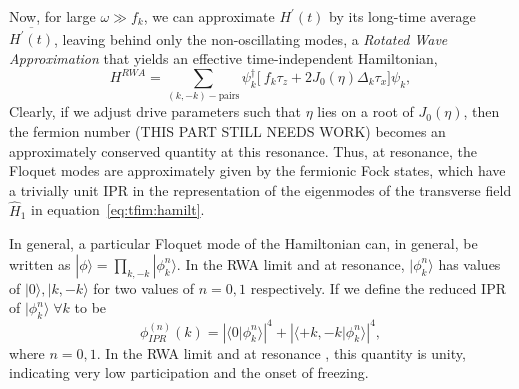 \documentclass[%
 reprint,
superscriptaddress,
 amsmath,amssymb,
 aps,
prb,
]{revtex4-2}
\begin{document}
Now, for large $\omega \gg f_k$, we can approximate $H^\prime(t)$ by its long-time average $\overline{H^\prime(t)}$, leaving behind only the non-oscillating modes, a  \textit{Rotated Wave Approximation} that yields an effective time-independent Hamiltonian,
\begin{equation}
H^{RWA} = \sum_{(k,-k)-\mbox{pairs}} \psi^\dagger_k
\bigg[\ f_k\tau_z + 2 J_0(\eta) \Delta_k\tau_x \bigg]\psi_k,
\end{equation}
Clearly, if we adjust drive parameters such that $\eta$ lies on a root of $J_0(\eta)$, then the fermion number (THIS PART STILL NEEDS WORK) becomes an approximately conserved quantity at this resonance. Thus, at resonance, the Floquet modes are approximately given by the fermionic Fock states, which have a trivially unit IPR in the representation of the eigenmodes of the transverse field $\hat{H}_1$ in equation~\ref{eq:tfim:hamilt}.

In general, a particular Floquet mode of the Hamiltonian can, in general, be written as $|\phi\rangle = \prod_{k,-k}|\phi^n_k\rangle$. In the RWA limit and at resonance, $|\phi^n_k\rangle$ has values of $|0\rangle, |k,-k\rangle$ for two values of $n=0,1$ respectively. If we define the reduced IPR of $|\phi^n_k\rangle\; \forall k$ to be
\begin{equation}
	\label{eq:ipr:ising}
	\phi^{(n)}_{IPR}(k) = \left\vert \langle 0 |\phi^n_k\rangle  \right\vert^4 + \left\vert \langle +k, -k |\phi^n_k\rangle  \right\vert^4,
\end{equation}
where $n=0,1$. In the RWA limit and at resonance , this quantity is unity, indicating very low participation and the onset of freezing.
\end{document}
